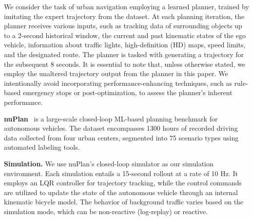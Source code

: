 \documentclass[letterpaper, 10 pt, conference]{ieeeconf}  %
\renewcommand{\paragraph}[1]{\vspace{1.25mm}\noindent\textbf{#1}}
\begin{document}
We consider the task of urban navigation employing a learned planner, trained by imitating the expert trajectory from the dataset. 
At each planning iteration, the planner receives various inputs, such as tracking data of surrounding objects up to a 2-second historical window, the current and past kinematic states of the ego vehicle, information about traffic lights, high-definition (HD) maps, speed limits, and the designated route. 
The planner is tasked with generating a trajectory for the subsequent 8 seconds. It is essential to note that, unless otherwise stated, we employ the unaltered trajectory output from the planner in this paper. We intentionally avoid incorporating performance-enhancing techniques, such as rule-based emergency stops or post-optimization, to assess the planner's inherent performance.

\paragraph{nuPlan}~\cite{caesar2021nuplan} is a large-scale closed-loop ML-based planning benchmark for autonomous vehicles. The dataset encompasses 1300 hours of recorded driving data collected from four urban centers, segmented into 75 scenario types using automated labeling tools. 

\paragraph{Simulation.} 
We use nuPlan's closed-loop simulator as our simulation environment. 
Each simulation entails a 15-second rollout at a rate of 10 Hz. 
It employs an LQR controller for trajectory tracking, while the control commands are utilized to update the state of the autonomous vehicle through an internal kinematic bicycle model. 
The behavior of background traffic varies based on the simulation mode, which can be non-reactive (log-replay) or reactive. 
\end{document}
